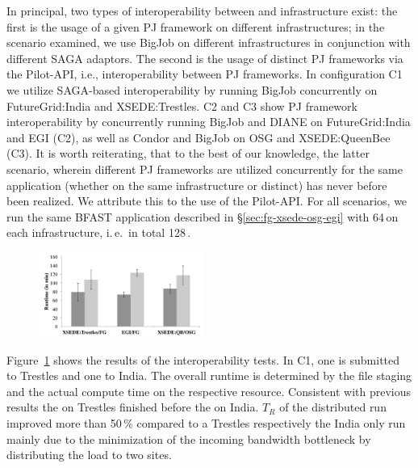 \documentclass[conference]{IEEEtran}
\begin{document}
In principal, two types of interoperability between \pilotjobs and
infrastructure exist: the first is the usage of a given PJ framework
on different infrastructures; in the scenario examined, we use BigJob
on different infrastructures in conjunction with different SAGA
adaptors.  The second is the usage of distinct PJ frameworks via the
Pilot-API, i.e., interoperability between PJ frameworks. In
configuration C1 we utilize SAGA-based interoperability by running
BigJob concurrently on FutureGrid:India and XSEDE:Trestles. C2 and C3
show PJ framework interoperability by concurrently running BigJob and
DIANE on FutureGrid:India and EGI (C2), as well as Condor and BigJob
on OSG and XSEDE:QueenBee (C3). It is worth reiterating, that to the
best of our knowledge, the latter scenario, wherein different PJ
frameworks are utilized concurrently for the same application
(whether on the same infrastructure or distinct) has never before been
realized. We attribute this to the use of the Pilot-API.  For all
scenarios, we run the same BFAST application described in
\S\ref{sec:fg-xsede-osg-egi} with 64\,\cus on each infrastructure,
i.\,e.\ in total 128\,\cus.

\begin{figure}[htbp]
  \upp
  	\centering
	\includegraphics[width=0.48\textwidth]{../perf/interop/128-bfast-interop-with-staging.pdf}
	\caption{}
	\label{fig:perf_interop_128-bfast-interop}
\end{figure}


Figure~\ref{fig:perf_interop_128-bfast-interop} shows the results of
the interoperability tests. In C1, one \pilot is submitted to Trestles
and one to India. 
The overall runtime is determined by the file staging and the actual compute
time on the respective resource. Consistent with previous results the \pilot
on Trestles finished before the \pilot on India. $T_R$ of the distributed run
improved more than 50\,\% compared to a Trestles respectively the India only
run mainly due to the minimization of the incoming bandwidth bottleneck by
distributing the load to two sites.
\end{document}
